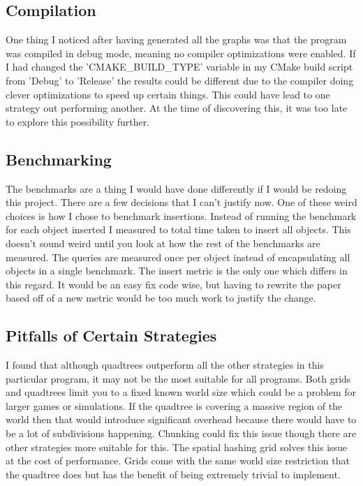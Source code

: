 \documentclass[a4paper, 12pt]{article}
\begin{document}
\subsection{Compilation}
One thing I noticed after having generated all the graphs was that the program
was compiled in debug mode, meaning no compiler optimizations were enabled. If I
had changed the 'CMAKE\_BUILD\_TYPE' variable in my CMake build script from
'Debug' to 'Release' the results could be different due to the compiler doing
clever optimizations to speed up certain things. This could have lead to one
strategy out performing another. At the time of discovering this, it was too
late to explore this possibility further.

\subsection{Benchmarking}
The benchmarks are a thing I would have done differently if I would be redoing
this project. There are a few decisions that I can't justify now. One of these
weird choices is how I chose to benchmark insertions. Instead of running the
benchmark for each object inserted I measured to total time taken to insert all
objects. This doesn't sound weird until you look at how the rest of the
benchmarks are measured. The queries are measured once per object instead of
encapsulating all objects in a single benchmark. The insert metric is the only
one which differs in this regard. It would be an easy fix code wise, but having
to rewrite the paper based off of a new metric would be too much work to justify
the change.

\subsection{Pitfalls of Certain Strategies}
I found that although quadtrees outperform all the other strategies in this
particular program, it may not be the most suitable for all programs. Both grids
and quadtrees limit you to a fixed known world size which could be a problem for
larger games or simulations. If the quadtree is covering a massive region of the
world then that would introduce significant overhead because there would have to
be a lot of subdivisions happening. Chunking could fix this issue though there
are other strategies more suitable for this. The spatial hashing grid solves
this issue at the cost of performance. Grids come with the same world size restriction that the quadtree does but has
the benefit of being extremely trivial to implement.
\end{document}
